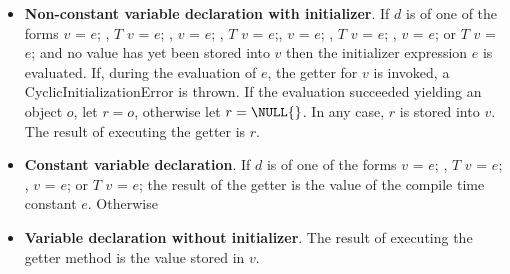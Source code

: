 \documentclass{article}
\newcommand{\code}[1]{{\sf #1}}
\begin{document}
\begin{itemize}
\item {\bf Non-constant variable declaration with initializer}. If $d$ is of one of the forms \code{\VAR{} $v$ = $e$;} ,  \code{$T$ $v$ = $e$;} ,   \code{\FINAL{} $v$ = $e$;} ,  \code{\FINAL{} $T$ $v$ = $e$;}, \code{\STATIC{} $v$ = $e$; }, \code{\STATIC{} $T$ $v$ = $e$; }, \code{\STATIC{} \FINAL{} $v$ = $e$; } or \code{\STATIC{} \FINAL{} $T$ $v$ = $e$;} and no value has yet been stored into $v$ then the initializer expression $e$ is evaluated. If, during the evaluation of $e$, the getter for $v$ is invoked, a \code{CyclicInitializationError} is thrown. If the evaluation succeeded yielding an object $o$, let $r = o$, otherwise let $r = \NULL{}$. In any case, $r$ is stored into $v$. The result of executing the getter is $r$.
\item  {\bf Constant variable declaration}. If $d$ is of one of the forms \code{\CONST{} $v$ = $e$; } ,  \code{\CONST{} $T$  $v$ = $e$; },  \code{\STATIC{} \CONST{} $v$ = $e$; }  or \code{\STATIC{} \CONST{} $T$ $v$ = $e$;} the result of the getter is the value of the compile time constant $e$. 
Otherwise
\item {\bf Variable declaration without initializer}. The result of executing the getter method is the value stored in $v$.
\end{itemize}
\end{document}
